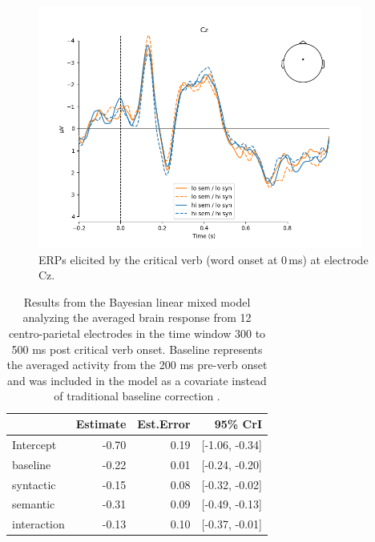 \documentclass[a4paper, man, floatsintext]{apa7}
\begin{document}
\begin{figure}[H]
    \caption{ERPs elicited by the critical verb (word onset at 0\,ms) at electrode Cz.}
    \label{fig:erp_all}
    \centering
    \includegraphics[width=0.95\textwidth]{images/N_103_Cz_crit.png}
\end{figure}

\begin{table}[H]
    \caption{Results from the Bayesian linear mixed model analyzing the averaged brain response from 12 centro-parietal electrodes in the time window 300 to 500 ms post critical verb onset. Baseline represents the averaged activity from the 200 ms pre-verb onset and was included in the model as a covariate instead of traditional baseline correction \citep[see][]{alday2019}.}
    \label{tab:eeg_mod}
    \centering
    \begin{tabular}{lrrr}
    \toprule
    & Estimate & Est.Error & 95\% CrI  \\
    \midrule
Intercept &  -0.70 & 0.19 &  [-1.06, -0.34] \\
baseline  &  -0.22 & 0.01 &  [-0.24, -0.20] \\
syntactic &  -0.15 & 0.08 &  [-0.32, -0.02] \\
semantic  &  -0.31 & 0.09 &  [-0.49, -0.13] \\
interaction& -0.13 & 0.10 &  [-0.37, -0.01] \\
    \bottomrule
    \end{tabular}
\end{table}
\end{document}
